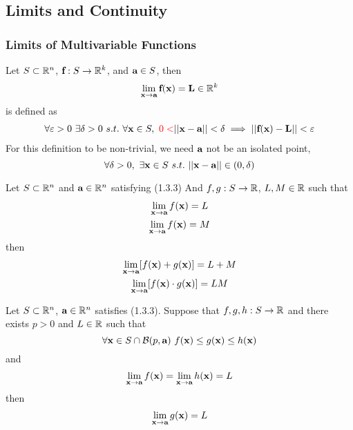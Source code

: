 \documentclass[11pt]{article}
\begin{document}
		\subsection{Limits and Continuity}
			\subsubsection{Limits of Multivariable Functions}
			\begin{definition}
				Let $S \subset \mathbb{R}^n$, $\textbf{f}: S \to \mathbb{R}^k$, and $\textbf{a} \in S$, then
				\begin{equation}
					\lim_{\textbf{x} \to \textbf{a}} \textbf{f}(\textbf{x}) = \textbf{L} \in \mathbb{R}^k
				\end{equation}
				is defined as
				\begin{gather}
					\forall \varepsilon > 0\ \exists \delta > 0\ s.t.\ \forall \ve{x} \in S,\ \red{0 <} \norm{\ve{x} - \ve{a}} < \delta \implies \norm{\ve{f}(\ve{x}) - \ve{L}} < \varepsilon
				\end{gather}
				For this definition to be non-trivial, we need $\textbf{a}$ not be an isolated point,
				\begin{equation}
					\forall \delta > 0,\ \exists \textbf{x} \in S\ s.t.\ \vert \vert {\textbf{x} - \textbf{a}} \vert \vert \in (0, \delta)
				\end{equation}
			\end{definition}
			
			\begin{theorem}
				Let $S \subset \mathbb{R}^n$ and $\textbf{a} \in \mathbb{R}^n$ satisfying (1.3.3)
				And $f, g: S \to \mathbb{R}$, $L, M \in \mathbb{R}$ such that
				\begin{gather}
					\lim_{\textbf{x} \to \textbf{a}} f(\textbf{x}) = L \\
					\lim_{\textbf{x} \to \textbf{a}} f(\textbf{x}) = M
				\end{gather}
				then 
				\begin{gather}
					\lim_{\textbf{x} \to \textbf{a}} [f(\textbf{x})	+ g(\textbf{x})] = L + M\\
					\lim_{\textbf{x} \to \textbf{a}} [f(\textbf{x}) \cdot g(\textbf{x})] = LM
				\end{gather}
			\end{theorem}
			
			\begin{theorem}
				Let $S \subset \mathbb{R}^n$, $\textbf{a} \in \mathbb{R}^n$ satisfies (1.3.3). Suppose that $f, g, h: S \to \mathbb{R}$ and there exists $p > 0$ and $L \in \mathbb{R}$ such that
				\begin{equation}
					\forall \ve{x} \in S \cap \mc{B}(p, \ve{a})\ f(\ve{x}) \leq g(\ve{x}) \leq h(\ve{x})
				\end{equation}
				and 
				\begin{equation}
					\lim_{\textbf{x} \to \textbf{a}} f(\textbf{x}) = \lim_{\textbf{x} \to \textbf{a}} h(\textbf{x}) = L
				\end{equation}
				then 
				\begin{equation}
					\lim_{\textbf{x} \to \textbf{a}} g(\textbf{x}) = L
				\end{equation}
			\end{theorem}
			
\end{document}

